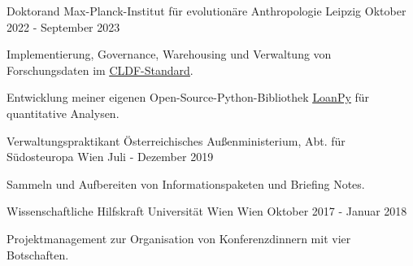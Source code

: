 \begin{cventries}

  \cventry
    {Doktorand} %
    {Max-Planck-Institut für evolutionäre Anthropologie} %
    {Leipzig} %
    {Oktober 2022 - September 2023} %
    {
      \begin{cvitems} %
      \item{Implementierung, Governance, Warehousing und Verwaltung von Forschungsdaten im \underline{\href{https://cldf.clld.org/}{CLDF-Standard}}.}
      \item{Entwicklung meiner eigenen Open-Source-Python-Bibliothek \underline{\href{https://pypi.org/project/loanpy/}{LoanPy}} für quantitative Analysen.}
      \end{cvitems}
    }
    
  \cventry
    {Verwaltungspraktikant} %
    {Österreichisches Außenministerium, Abt. für Südosteuropa} %
    {Wien} %
    {Juli - Dezember 2019} %
    {
      \begin{cvitems} %
        \item{Sammeln und Aufbereiten von Informationspaketen und Briefing Notes.}
      \end{cvitems}
    }

  \cventry
    {Wissenschaftliche Hilfskraft} %
    {Universität Wien} %
    {Wien} %
    {Oktober 2017 - Januar 2018} %
    {
    \begin{cvitems}
    \item{Projektmanagement zur Organisation von Konferenzdinnern mit vier Botschaften.}
    \end{cvitems}
    }
    

        
\end{cventries}
